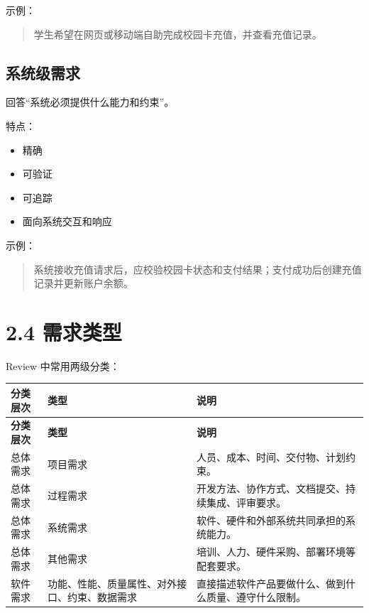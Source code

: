 \documentclass[UTF8,zihao=-4]{ctexart}
\begin{document}
示例：

\begin{quote}
学生希望在网页或移动端自助完成校园卡充值，并查看充值记录。
\end{quote}

\subsection{系统级需求}

回答“系统必须提供什么能力和约束”。

特点：

\begin{itemize}
\item 精确
\item 可验证
\item 可追踪
\item 面向系统交互和响应
\end{itemize}

示例：

\begin{quote}
系统接收充值请求后，应校验校园卡状态和支付结果；支付成功后创建充值记录并更新账户余额。
\end{quote}

\section{2.4 需求类型}

Review 中常用两级分类：

{
\footnotesize
\begin{longtable}{|>{\raggedright\arraybackslash}p{}|>{\raggedright\arraybackslash}p{}|>{\raggedright\arraybackslash}p{}|}
\hline
\textbf{分类层次} & \textbf{类型} & \textbf{说明} \\
\hline
\endfirsthead
\hline
\textbf{分类层次} & \textbf{类型} & \textbf{说明} \\
\hline
\endhead
总体需求 & 项目需求 & 人员、成本、时间、交付物、计划约束。 \\
\hline
总体需求 & 过程需求 & 开发方法、协作方式、文档提交、持续集成、评审要求。 \\
\hline
总体需求 & 系统需求 & 软件、硬件和外部系统共同承担的系统能力。 \\
\hline
总体需求 & 其他需求 & 培训、人力、硬件采购、部署环境等配套要求。 \\
\hline
软件需求 & 功能、性能、质量属性、对外接口、约束、数据需求 & 直接描述软件产品要做什么、做到什么质量、遵守什么限制。 \\
\hline
\end{longtable}
}
\end{document}
